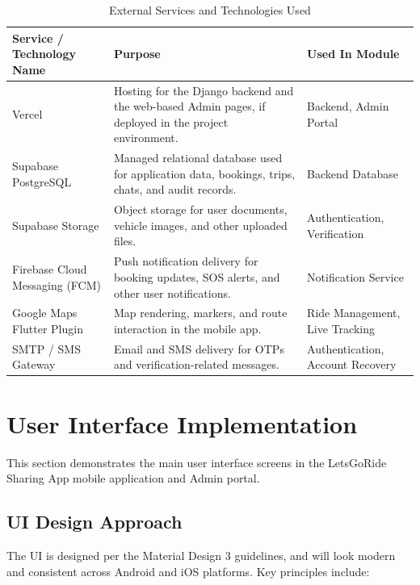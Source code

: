 \begin{table}[H]
\centering
\caption{External Services and Technologies Used}
\begin{tabularx}{\textwidth}{|p{3.5cm}|X|p{4cm}|}
\hline
\textbf{Service / Technology Name} & \textbf{Purpose} & \textbf{Used In Module} \\
\hline
Vercel & Hosting for the Django backend and the web-based Admin pages, if deployed in the project environment. & Backend, Admin Portal \\
\hline
Supabase PostgreSQL & Managed relational database used for application data, bookings, trips, chats, and audit records. & Backend Database \\
\hline
Supabase Storage & Object storage for user documents, vehicle images, and other uploaded files. & Authentication, Verification \\
\hline
Firebase Cloud Messaging (FCM) & Push notification delivery for booking updates, SOS alerts, and other user notifications. & Notification Service \\
\hline
Google Maps Flutter Plugin & Map rendering, markers, and route interaction in the mobile app. & Ride Management, Live Tracking \\
\hline
SMTP / SMS Gateway & Email and SMS delivery for OTPs and verification-related messages. & Authentication, Account Recovery \\
\hline
\end{tabularx}
\end{table}


\section{User Interface Implementation}

This section demonstrates the main user interface screens in the LetsGoRide Sharing App mobile application and Admin portal.

\subsection{UI Design Approach}

The UI is designed per the Material Design 3 guidelines, and will look modern and consistent across Android and iOS platforms. Key principles include:

